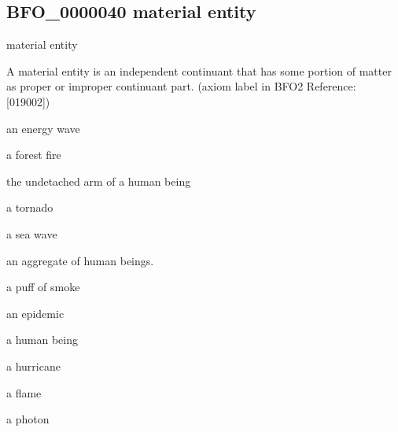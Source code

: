 \documentclass[letterpaper,10pt,english]{sphinxmanual}
\begin{document}
\begin{sphinxShadowBox}

\sphinxAtStartPar
{}
\end{sphinxShadowBox}
\begin{quote}

\ignorespaces \end{quote}


\subsection{BFO\_0000040 \sphinxhyphen{} material entity}
\label{\detokenize{doc-BFO_0000040:bfo-0000040-material-entity}}\label{\detokenize{doc-BFO_0000040:index-0}}\label{\detokenize{doc-BFO_0000040::doc}}
\begin{sphinxShadowBox}

\sphinxAtStartPar
material entity
\end{sphinxShadowBox}

\begin{sphinxShadowBox}

\sphinxAtStartPar
{\hyperref[\detokenize{doc-BFO_0000004::doc}]{}}
\end{sphinxShadowBox}

\begin{sphinxShadowBox}

\sphinxAtStartPar
A material entity is an independent continuant that has some portion of matter as proper or improper continuant part. (axiom label in BFO2 Reference: {[}019\sphinxhyphen{}002{]})
\end{sphinxShadowBox}

\begin{sphinxShadowBox}

\sphinxAtStartPar
an energy wave

\sphinxAtStartPar
a forest fire

\sphinxAtStartPar
the undetached arm of a human being

\sphinxAtStartPar
a tornado

\sphinxAtStartPar
a sea wave

\sphinxAtStartPar
an aggregate of human beings.

\sphinxAtStartPar
a puff of smoke

\sphinxAtStartPar
an epidemic

\sphinxAtStartPar
a human being

\sphinxAtStartPar
a hurricane

\sphinxAtStartPar
a flame

\sphinxAtStartPar
a photon
\end{sphinxShadowBox}
\end{document}
